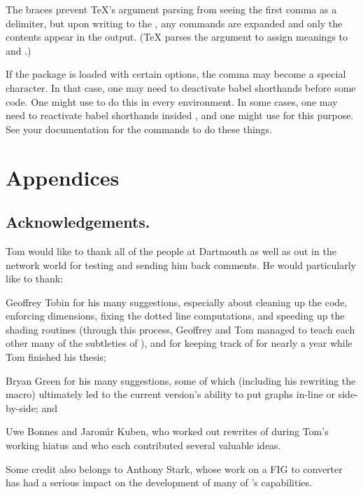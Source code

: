 \documentclass[letterpaper]{article}
\begin{document}
The braces prevent \TeX{}'s argument parsing from seeing the first comma
as a delimiter, but upon writing to the , any 
commands are expanded and only the contents appear in the output. (\TeX{}
parses the argument to assign meanings to  and .)

If the  package is loaded with certain options, the comma
may become a special character. In that case, one may need to deactivate
babel shorthands before some \mfp{} code. One might use 
to do this in every  environment. In some cases, one may need
to reactivate babel shorthands insided , and one might use
 for this purpose. See your  documentation
for the commands to do these things.

\clearpage

\def\sectionmark#1{\markright {\thesection\quad#1}}%
\def\subsectionmark#1{}
\def\subsubsectionmark#1{}
\thispagestyle{plain}
\chapter{Appendices}\label{appendices}


\section{Acknowledgements.}\label{acknowledgements}

Tom would like to thank all of the people at Dartmouth as well as out in
the network world for testing \mfp{} and sending him back
comments. He would particularly like to thank:

Geoffrey Tobin
for his many suggestions, especially about cleaning up the \MF{} code,
enforcing dimensions, fixing the dotted line computations, and speeding
up the shading routines (through this process, Geoffrey and Tom managed
to teach each other many of the subtleties of \MF{}), and for keeping
track of \mfp{} for nearly a year while Tom finished his thesis;

Bryan Green
for his many suggestions, some of which (including his rewriting the
 macro) ultimately led to the current version's ability to
put graphs in-line or side-by-side; and

Uwe Bonnes and
Jarom\'\i r Kuben,
who worked out rewrites of \mfp{} during Tom's working hiatus and who
each contributed several valuable ideas.

Some credit also belongs to
Anthony Stark,
whose work on a FIG to \MF{} converter has had a serious impact on the
development of many of \mfp{}'s capabilities.
\end{document}
